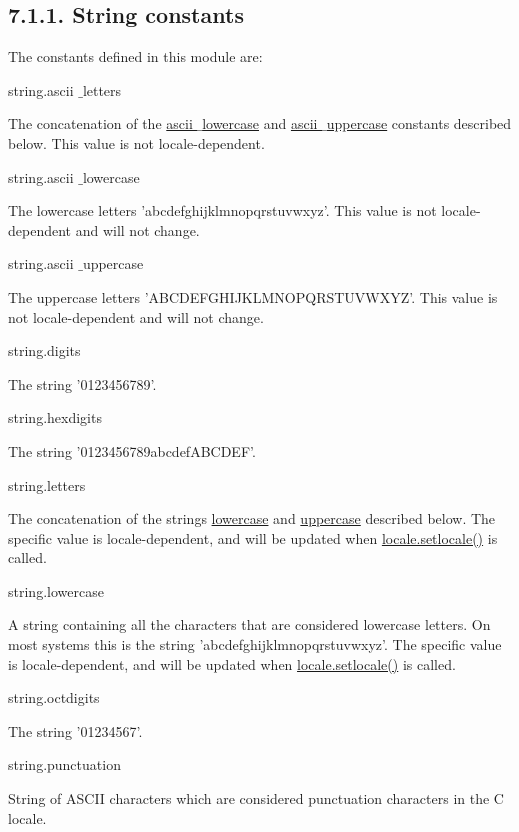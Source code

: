 \documentclass[a4paper,12pt]{report}
\begin{document}
\subsection*{7.1.1. String constants}
 \par
\noindent 
The constants defined in this module are: \par
\noindent 
string.ascii $  \_  $letters \par
The concatenation of the \href{https://docs.python.org/2/library/string.html}{ascii $  \_  $lowercase}
 and \href{https://docs.python.org/2/library/string.html}{ascii $  \_  $uppercase}
 constants described below. This value is not locale-dependent. \par
\noindent 
string.ascii $  \_  $lowercase \par
The lowercase letters 'abcdefghijklmnopqrstuvwxyz'. This value is not locale-dependent and will not change. \par
\noindent 
string.ascii $  \_  $uppercase \par
The uppercase letters 'ABCDEFGHIJKLMNOPQRSTUVWXYZ'. This value is not locale-dependent and will not change. \par
\noindent 
string.digits \par
The string '0123456789'. \par
\noindent 
string.hexdigits \par
The string '0123456789abcdefABCDEF'. \par
\noindent 
string.letters \par
The concatenation of the strings \href{https://docs.python.org/2/library/string.html}{lowercase}
 and \href{https://docs.python.org/2/library/string.html}{uppercase}
 described below. The specific value is locale-dependent, and will be updated when \href{https://docs.python.org/2/library/locale.html}{locale.setlocale()}
 is called. \par
\noindent 
string.lowercase \par
A string containing all the characters that are considered lowercase letters. On most systems this is the string 'abcdefghijklmnopqrstuvwxyz'. The specific value is locale-dependent, and will be updated when \href{https://docs.python.org/2/library/locale.html}{locale.setlocale()}
 is called. \par
\noindent 
string.octdigits \par
The string '01234567'. \par
\noindent 
string.punctuation \par
String of ASCII characters which are considered punctuation characters in the C locale. \par
\end{document}
